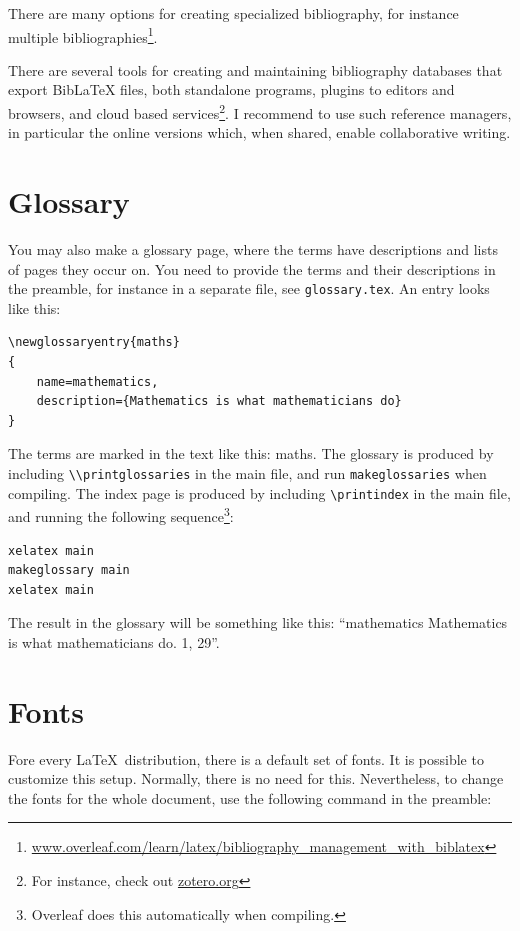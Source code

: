 There are many options for creating specialized bibliography, for instance multiple bibliographies\footnote{\url{www.overleaf.com/learn/latex/bibliography_management_with_biblatex}}.

There are several tools for creating and maintaining bibliography databases that export BibLaTeX files, both standalone programs, plugins to editors and browsers, and cloud based services\footnote{For instance, check out \url{zotero.org}}. I recommend to use such reference managers, in particular the online versions which, when shared, enable collaborative writing.

\section{Glossary}

You may also make a glossary page, where the terms have descriptions and lists of pages they occur on. You need to provide the terms and their descriptions in the preamble, for instance in a separate file, see \verb|glossary.tex|. An entry looks like this:

\begin{lstlisting}[float,float=!htbp]
\newglossaryentry{maths}
{
    name=mathematics,
    description={Mathematics is what mathematicians do}
}
\end{lstlisting}

The terms are marked in the text like this:  
\gls{maths}. The glossary is produced by including \verb|\\printglossaries| in the main file, and run \verb|makeglossaries| when compiling. The index page is produced by including \verb|\printindex| in the main file, and running the following sequence\footnote{Overleaf does this automatically when compiling.}:

\begin{lstlisting}[float,float=!htbp]
xelatex main
makeglossary main
xelatex main
\end{lstlisting}

The result in the glossary will be something like this:  ``mathematics Mathematics is what mathematicians do. 1, 29''.

\section{Fonts}

Fore every  \LaTeX\ distribution, there is a default set of fonts.
It is possible to customize this  setup.
Normally, there is no need for this.
Nevertheless, to change the fonts for the whole document, use the following command in the preamble:

